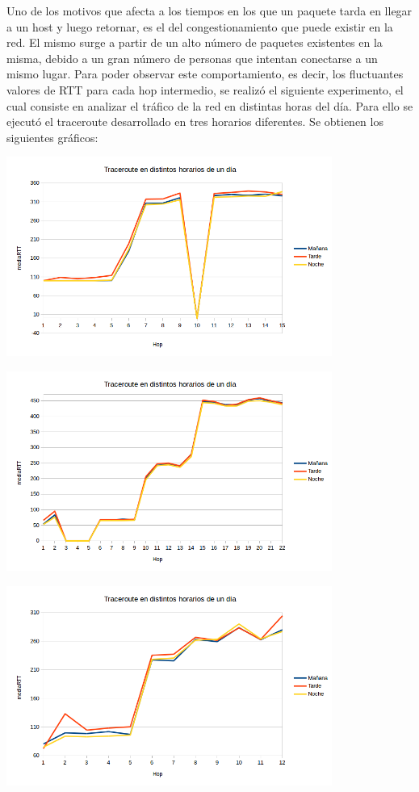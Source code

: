 Uno de los motivos que afecta a los tiempos en los que un paquete tarda en llegar a un host y luego retornar, es el del congestionamiento que puede existir en la red. El mismo surge a partir de un alto número de paquetes existentes en la misma, debido a un gran número de personas que intentan conectarse a un mismo lugar. Para poder observar este comportamiento, es decir, los fluctuantes valores de RTT para cada hop intermedio, se realizó el siguiente experimento, el cual consiste en analizar el tráfico de la red en distintas horas del día. Para ello se ejecutó el traceroute desarrollado en tres horarios diferentes. Se obtienen los siguientes gráficos:


\centerline{\includegraphics[width=0.8\textwidth]{imagenes/1ra_parte/trace_distintos_horarios_rusia.png}}

\centerline{\includegraphics[width=0.8\textwidth]{imagenes/1ra_parte/trace_distintos_horarios_japon.png}}

\centerline{\includegraphics[width=0.8\textwidth]{imagenes/1ra_parte/trace_distintos_horarios_eeuu.png}}

